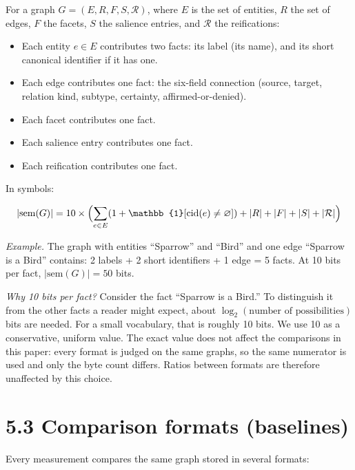 \begin{definition}
For a graph $G = (E, R, F, S, \mathcal{R})$, where $E$ is the set of entities, $R$ the set of edges, $F$ the facets, $S$ the salience entries, and $\mathcal{R}$ the reifications:
\begin{itemize}
\item Each entity $e \in E$ contributes two facts: its label (its name), and its short canonical identifier if it has one.
\item Each edge contributes one fact: the six-field connection (source, target, relation kind, subtype, certainty, affirmed-or-denied).
\item Each facet contributes one fact.
\item Each salience entry contributes one fact.
\item Each reification contributes one fact.
\end{itemize}
\end{definition}

In symbols:

\begin{equation}
|\text{sem}(G)| = 10 \times \Bigl( \sum_{e \in E} (1 + \mathbb{1}[\text{cid}(e) \neq \varnothing]) + |R| + |F| + |S| + |\mathcal{R}| \Bigr)
\end{equation}

\textit{Example.} The graph with entities ``Sparrow'' and ``Bird'' and one edge ``Sparrow is a Bird'' contains: 2 labels + 2 short identifiers + 1 edge = 5 facts. At 10 bits per fact, $|\text{sem}(G)| = 50$ bits.

\textit{Why 10 bits per fact?} Consider the fact ``Sparrow is a Bird.'' To distinguish it from the other facts a reader might expect, about $\log_2(\text{number of possibilities})$ bits are needed. For a small vocabulary, that is roughly 10 bits. We use 10 as a conservative, uniform value. The exact value does not affect the comparisons in this paper: every format is judged on the same graphs, so the same numerator is used and only the byte count differs. Ratios between formats are therefore unaffected by this choice.

\section*{5.3 Comparison formats (baselines)}

Every measurement compares the same graph stored in several formats:

